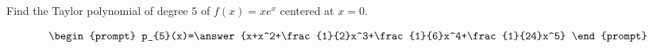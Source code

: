 \documentclass{ximera}
\author{Gregory Hartman \and Matthew Carr}
\begin{document}
\begin{exercise}




Find the Taylor polynomial of degree $5$ of $f(x)=x e^{x}$ centered at $x=0$.

\[
\begin{prompt}
p_{5}(x)=\answer{x+x^2+\frac{1}{2}x^3+\frac{1}{6}x^4+\frac{1}{24}x^5}
\end{prompt}
\]

\end{exercise}
\end{document}
